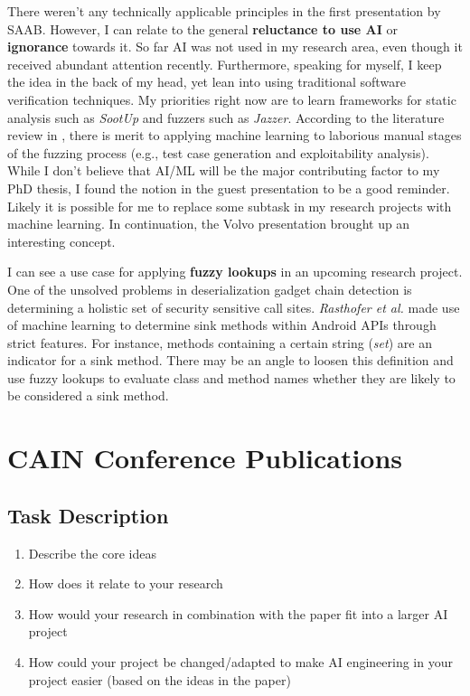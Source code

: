 \documentclass[11pt]{article}
\begin{document}
There weren't any technically applicable principles in the first presentation by SAAB. However, I can relate to the general \textbf{reluctance to use AI} or \textbf{ignorance} towards it. So far AI was not used in my research area, even though it received abundant attention recently. Furthermore, speaking for myself, I keep the idea in the back of my head, yet lean into using traditional software verification techniques. My priorities right now are to learn frameworks for static analysis such as \textit{SootUp} and fuzzers such as \textit{Jazzer}. According to the literature review in \cite{wang_systematic_2020}, there is merit to applying machine learning to laborious manual stages of the fuzzing process (e.g., test case generation and exploitability analysis). While I don't believe that AI/ML will be the major contributing factor to my PhD thesis, I found the notion in the guest presentation to be a good reminder. Likely it is possible for me to replace some subtask in my research projects with machine learning. In continuation, the Volvo presentation brought up an interesting concept.

I can see a use case for applying \textbf{fuzzy lookups} in an upcoming research project. One of the unsolved problems in deserialization gadget chain detection is determining a holistic set of security sensitive call sites. \textit{Rasthofer et al.} \cite{rasthofer_machine-learning_2014} made use of machine learning to determine sink methods within Android APIs through strict features. For instance, methods containing a certain string (\textit{set}) are an indicator for a sink method. There may be an angle to loosen this definition and use fuzzy lookups to evaluate class and method names whether they are likely to be considered a sink method.


\section*{CAIN Conference Publications}

\subsection{Task Description}

\begin{enumerate}
    \item Describe the core ideas
    \item How does it relate to your research
    \item How would your research in combination with the paper fit into a larger AI project
    \item How could your project be changed/adapted to make AI engineering in your project easier (based on the ideas in the paper)
\end{enumerate}
\end{document}
